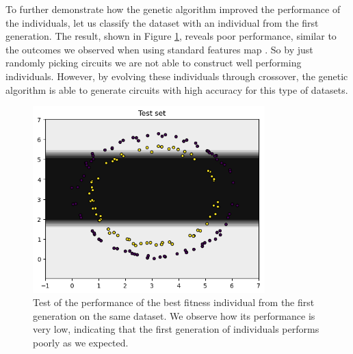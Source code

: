 \documentclass[12pt]{article}
\begin{document}
To further demonstrate how the genetic algorithm improved the performance of the individuals, let us classify the dataset with an individual from the first generation. The result, shown in Figure \ref{fig:bad}, reveals poor performance, similar to the outcomes we observed when using standard features map . So by just randomly picking circuits we are not able to construct well performing individuals. However, by evolving these individuals through crossover, the genetic algorithm is able to generate circuits with high accuracy for this type of datasets.
\begin{figure}[h!]
    \centering
    \includegraphics[width=0.8\textwidth]{images/badresult.png}
    \caption{Test of the performance of the best fitness individual from the first generation on the same dataset. We observe how its performance is very low, indicating that the first generation of individuals performs poorly as we expected.}
    \label{fig:bad}
\end{figure}
\end{document}
